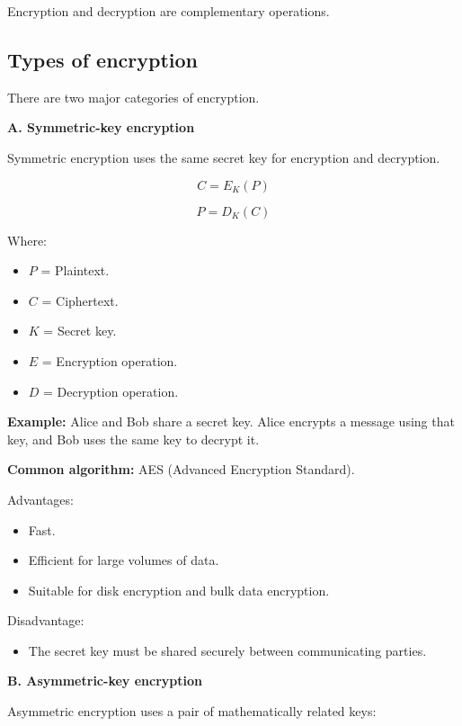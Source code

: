 Encryption and decryption are complementary operations.

\subsection{Types of encryption}

There are two major categories of encryption.

\textbf{A. Symmetric-key encryption}

Symmetric encryption uses the same secret key for encryption and decryption.



\[
C=E_K(P)
\]





\[
P=D_K(C)
\]



Where:

\begin{itemize}
\item $P$ = Plaintext.
\item $C$ = Ciphertext.
\item $K$ = Secret key.
\item $E$ = Encryption operation.
\item $D$ = Decryption operation.
\end{itemize}

\textbf{Example:} Alice and Bob share a secret key. Alice encrypts a message using that key, and Bob uses the same key to decrypt it.

\textbf{Common algorithm:} AES (Advanced Encryption Standard).

Advantages:

\begin{itemize}
\item Fast.
\item Efficient for large volumes of data.
\item Suitable for disk encryption and bulk data encryption.
\end{itemize}

Disadvantage:

\begin{itemize}
\item The secret key must be shared securely between communicating parties.
\end{itemize}

\textbf{B. Asymmetric-key encryption}

Asymmetric encryption uses a pair of mathematically related keys:

